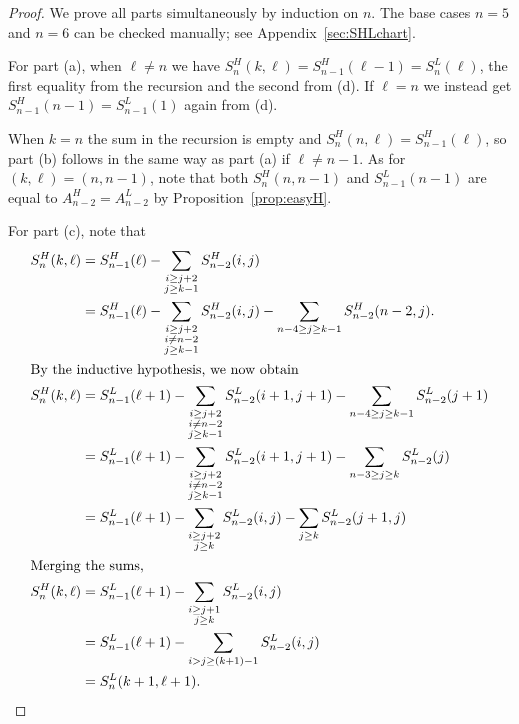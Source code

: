 \documentclass[11pt]{amsart}
\theoremstyle{definition}
\begin{document}
\begin{proof}
	We prove all parts simultaneously by induction on $n$.
	The base cases $n=5$ and $n=6$ can be checked manually;
	see Appendix~\ref{sec:SHLchart}.

	For part (a), when $\ell \neq n$ we have
	$S_n^H(k,\ell) = S_{n-1}^H(\ell-1) = S_n^L(\ell)$,
	the first equality from the recursion and the second from (d).
	If $\ell = n$ we instead get $S_{n-1}^H(n-1) = S_{n-1}^L(1)$
	again from (d).

	When $k=n$ the sum in the recursion is empty and
	$S_n^H(n, \ell) = S_{n-1}^H(\ell)$,
	so part (b) follows in the same way as part (a)
	if $\ell \neq n-1$.
	As for $(k,\ell) = (n,n-1)$,
	note that both $S_n^H(n,n-1)$
	and $S_{n-1}^L(n-1)$ are equal to
	$A_{n-2}^H = A_{n-2}^L$
	by Proposition~\ref{prop:easyH}.

	For part (c), note that
	\begin{align*}
		S_n^H(k, \ell) &= S_{n-1}^H(\ell) - \sum_{\substack{i \ge j+2 \\ j \ge k-1}} S_{n-2}^H(i,j) \\
		&= S_{n-1}^H(\ell) - \sum_{\substack{i \ge j+2 \\ i \neq n-2 \\ j \ge k-1}} S_{n-2}^H(i,j)
			- \sum_{n-4 \ge j \ge k-1} S_{n-2}^H (n-2,j). \\
		\intertext{By the inductive hypothesis, we now obtain}
		S_n^H(k, \ell) 
		&= S_{n-1}^L(\ell+1) - \sum_{\substack{i \ge j+2 \\ i \neq n-2 \\ j \ge k-1}} S_{n-2}^L(i+1,j+1)
			- \sum_{n-4 \ge j \ge k-1} S_{n-2}^L (j+1) \\
		&= S_{n-1}^L(\ell+1) - \sum_{\substack{i \ge j+2 \\ i \neq n-2 \\ j \ge k-1}} S_{n-2}^L(i+1,j+1)
			- \sum_{n-3 \ge j \ge k} S_{n-2}^L (j) \\
		&= S_{n-1}^L(\ell+1) - \sum_{\substack{i \ge j+2 \\ j \ge k}} S_{n-2}^L(i,j)
			- \sum_{j \ge k} S_{n-2}^L (j+1, j) \\
		\intertext{Merging the sums,}
		S_n^H(k, \ell) 
		&= S_{n-1}^L(\ell+1) - \sum_{\substack{i \ge j+1 \\ j \ge k}} S_{n-2}^L(i,j)  \\
		&= S_{n-1}^L(\ell+1) - \sum_{i > j \ge (k+1)-1} S_{n-2}^L(i,j) \\
		&= S_n^L(k+1, \ell+1).
	\end{align*}


\end{proof}
\end{document}
